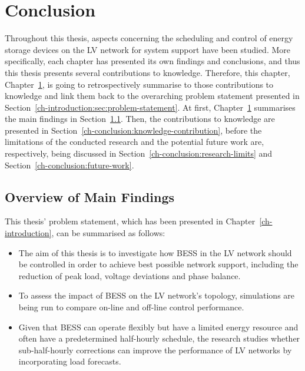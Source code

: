 \chapter{Conclusion}
\label{ch-conclusion}

Throughout this thesis, aspects concerning the scheduling and control of energy storage devices on the LV network for system support have been studied.
More specifically, each chapter has presented its own findings and conclusions, and thus this thesis presents several contributions to knowledge.
Therefore, this chapter, Chapter~\ref{ch-conclusion}, is going to retrospectively summarise to those contributions to knowledge and link them back to the overarching problem statement presented in Section~\ref{ch-introduction:sec:problem-statement}.
At first, Chapter~\ref{ch-conclusion} summarises the main findings in Section~\ref{ch-conclusion:main-findings}.
Then, the contributions to knowledge are presented in Section~\ref{ch-conclusion:knowledge-contribution}, before the limitations of the conducted research and the potential future work are, respectively, being discussed in Section~\ref{ch-conclusion:research-limits} and Section~\ref{ch-conclusion:future-work}.

\section{Overview of Main Findings}
\label{ch-conclusion:main-findings}

This thesis' problem statement, which has been presented in Chapter~\ref{ch-introduction}, can be summarised as follows:

\begin{itemize}
	\item
	The aim of this thesis is to investigate how BESS in the LV network should be controlled in order to achieve best possible network support, including the reduction of peak load, voltage deviations and phase balance.
	\item 
	To assess the impact of BESS on the LV network's topology, simulations are being run to compare on-line and off-line control performance.
	\item
	Given that BESS can operate flexibly but have a limited energy resource and often have a predetermined half-hourly schedule, the research studies whether sub-half-hourly corrections can improve the performance of LV networks by incorporating load forecasts.
\end{itemize}

